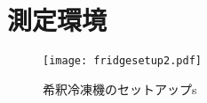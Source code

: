 \section{測定環境}
    \begin{figure}[H]
        \centering
        \texttt{[image: fridgesetup2.pdf]}
        \caption{希釈冷凍機のセットアップs}
    \end{figure}
